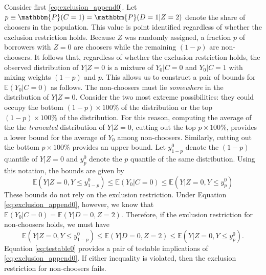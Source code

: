 Consider first \eqref{eq:exclusion_append0}.
Let $p \equiv \mathbbm{P}(C=1) = \mathbbm{P}(D=1|Z=2)$ denote the share of choosers in the population.
This value is point identified regardless of whether the exclusion restriction holds.
Because $Z$ was randomly assigned, a fraction $p$ of borrowers with $Z=0$ are choosers while the remaining $(1-p)$ are non-choosers.
It follows that, regardless of whether the exclusion restriction holds, the observed distribution of $Y|Z=0$ is a mixture of $Y_0|C=0$ and $Y_0|C=1$ with mixing weights $(1-p)$ and $p$.
This allows us to construct a pair of bounds for $\mathbb{E}(Y_0|C=0)$ as follows.
The non-choosers must lie \emph{somewhere} in the distribution of $Y|Z=0$.
Consider the two most extreme possibilities: they could occupy the bottom $(1-p)\times 100\%$ of the distribution or the top $(1-p)\times 100\%$ of the distribution.
For this reason, computing the average of the the \emph{truncated} distribution of $Y|Z=0$, cutting out the top $p\times 100\%$, provides a lower bound for the average of $Y_0$ among non-choosers.
Similarly, cutting out the bottom $p \times 100\%$ provides an upper bound.
Let $y^0_{1-p}$ denote the $(1-p)$ quantile of $Y|Z=0$ and $y^0_{p}$ denote the $p$ quantile of the same distribution.
Using this notation, the bounds are given by
\[
\mathbb{E}\left(Y|Z=0, Y\leq y^0_{1-p}\right)\leq \mathbb{E}(Y_0|C=0) \leq \mathbb{E}\left(Y|Z=0, Y \leq y^0_p\right) 
\]
These bounds do not rely on the exclusion restriction.
Under Equation \ref{eq:exclusion_append0}, however, we know that $\mathbb{E}(Y_0|C=0)=\mathbb{E}(Y|D=0,Z=2)$.
Therefore, if the exclusion restriction for non-choosers holds, we must have
\begin{equation}
\mathbb{E}\left(Y|Z=0, Y\leq y^0_{1-p}\right)\leq \mathbb{E}(Y|D=0,Z=2) \leq \mathbb{E}\left(Y|Z=0, Y \leq y^0_p\right).
\label{eq:testable0}
\end{equation}
Equation \ref{eq:testable0} provides a pair of testable implications of \eqref{eq:exclusion_append0}.
If either inequality is violated, then the exclusion restriction for non-choosers fails.

